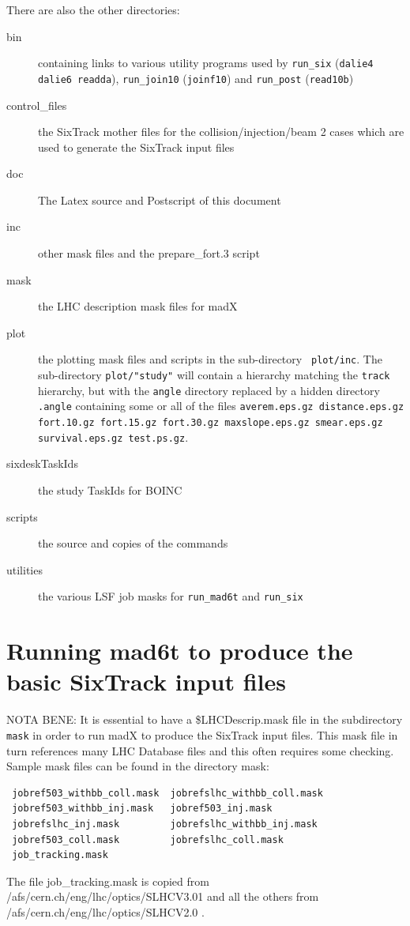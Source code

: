 \documentclass{cernatsnote}
\begin{document}
There are also the other directories:
\begin{description}
\item [bin] containing links to various utility programs used by \texttt{run\_six}
(\texttt{dalie4 dalie6 readda}), \texttt{run\_join10} (\texttt{joinf10})
and \texttt{run\_post} (\texttt{read10b}) \item [control\_files] the SixTrack mother
  files for the collision/injection/beam 2 cases which are used to generate the
  SixTrack input files
\item [doc] The Latex source and Postscript of this document
\item [inc] other mask files and the prepare\_fort.3 script
\item [mask] the LHC description mask files for madX
\item [plot] the plotting mask files and scripts in the sub-directory {\tt
  plot/inc}.  The sub-directory \texttt{plot/"study"} will contain a hierarchy
  matching the \texttt{track} hierarchy, but with the \texttt{angle} directory
  replaced by a hidden directory \texttt{.angle}  containing some or all of the
  files {\tt averem.eps.gz distance.eps.gz fort.10.gz fort.15.gz fort.30.gz
    maxslope.eps.gz smear.eps.gz survival.eps.gz test.ps.gz}.
\item [sixdeskTaskIds] the study TaskIds for BOINC
\item [scripts] the source and copies of the commands
\item [utilities] the various LSF job masks for \texttt{run\_mad6t} and \texttt{run\_six}
\end{description}
\section{Running mad6t to produce the basic SixTrack input files}
\label{sec:mad_6t}
NOTA BENE: It is essential to have a \$LHCDescrip.mask file in the subdirectory
\texttt{mask} in order to run madX to produce the SixTrack input files. This mask
file in turn references many LHC Database files and this often requires some
checking.  Sample mask files can be found in the directory mask:
\begin{verbatim}
 jobref503_withbb_coll.mask  jobrefslhc_withbb_coll.mask  
 jobref503_withbb_inj.mask   jobref503_inj.mask        
 jobrefslhc_inj.mask         jobrefslhc_withbb_inj.mask
 jobref503_coll.mask         jobrefslhc_coll.mask        
 job_tracking.mask
\end{verbatim}
The file job\_tracking.mask is copied from
/afs/cern.ch/eng/lhc/optics/SLHCV3.01 and all the others from
/afs/cern.ch/eng/lhc/optics/SLHCV2.0 \cite{31b}.
\end{document}
